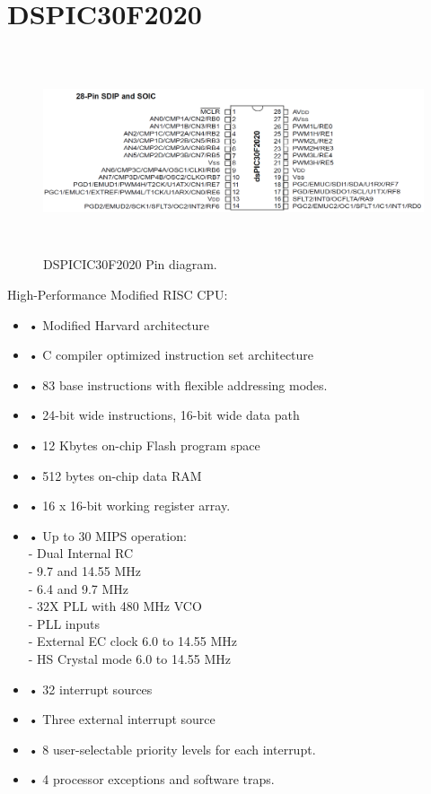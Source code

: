 \documentclass[12pt,a4paper]{report}
\begin{document}
\section{DSPIC30F2020}
\begin{figure}[h!]
\begin{center}
	\includegraphics[width=16cm,height=6cm]{figures/dsp_PINOUT.png}
\end{center}
\caption{DSPICIC30F2020 Pin diagram.}
	
\end{figure}


High-Performance Modified RISC CPU:\\

\begin{itemize}

\item • Modified Harvard architecture
\item• C compiler optimized instruction set architecture
\item• 83 base instructions with flexible addressing modes.
\item• 24-bit wide instructions, 16-bit wide data path
\item• 12 Kbytes on-chip Flash program space
\item• 512 bytes on-chip data RAM
\item• 16 x 16-bit working register array.
\item• Up to 30 MIPS operation:\\
- Dual Internal RC\\
- 9.7 and 14.55 MHz \\
- 6.4 and 9.7 MHz \\
- 32X PLL with 480 MHz VCO\\
- PLL inputs \\
- External EC clock 6.0 to 14.55 MHz\\
- HS Crystal mode 6.0 to 14.55 MHz\\
\item• 32 interrupt sources
\item• Three external interrupt source
\item• 8 user-selectable priority levels for each interrupt.
\item• 4 processor exceptions and software traps.
\end{itemize}
 
\end{document}
